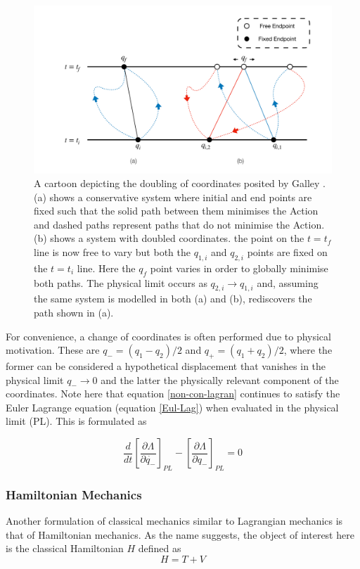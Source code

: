 \documentclass[10pt]{iopart}
\begin{document}
\begin{figure}
	\label{doubledCoords}
	\centering
	\includegraphics[width=\columnwidth]{Endpoints.pdf}
	\caption{A cartoon depicting the doubling of coordinates posited by Galley \cite{Galley}. (a) shows a conservative system where initial and end points are fixed such that the solid path between them minimises the Action and dashed paths represent paths that do not minimise the Action. (b) shows a system with doubled coordinates. the point on the $t=t_f$ line is now free to vary but both the $q_{1,i}$ and $q_{2,i}$ points are fixed on the $t=t_i$ line. Here the $q_f$ point varies in order to globally minimise both paths. The physical limit occurs as $q_{2,i}\to q_{1,i}$ and, assuming the same system is modelled in both (a) and (b), rediscovers the path shown in (a).}
\end{figure}

For convenience, a change of coordinates is often performed due to physical motivation. These are $q_- = (q_1 - q_2)/2$ and $q_+ = (q_1 + q_2)/2$, where the former can be considered a hypothetical displacement that vanishes in the physical limit $q_- \to 0$ and the latter the physically relevant component of the coordinates.
Note here that equation \ref{non-con-lagran} continues to satisfy the Euler Lagrange equation (equation \ref{Eul-Lag}) when evaluated in the physical limit (PL). This is formulated as

\begin{equation}
\label{NonConEulerLagrange}
	\frac{d}{dt} \left[\frac{\partial \Lambda}{\partial \dot{q_-}}\right]_{PL} - \left[\frac{\partial\Lambda}{\partial q_-}\right]_{PL} = 0
\end{equation}

\subsubsection{Hamiltonian Mechanics \\}
Another formulation of classical mechanics similar to Lagrangian mechanics is that of Hamiltonian mechanics. As the name suggests, the object of interest here is the classical Hamiltonian $H$ defined as 
\begin{equation}
\label{Hamiltonian}
	H = T + V
\end{equation}
\end{document}
